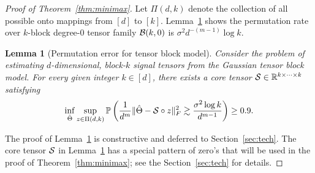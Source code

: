 \documentclass[12pt]{article}
\newtheorem{lem}{Lemma}
\theoremstyle{definition}
\begin{document}
\begin{proof}[Proof of Theorem~\ref{thm:minimax}]
Let $\Pi(d,k)$ denote the collection of all possible onto mappings from $[d]$ to $[k]$.
Lemma~\ref{lem:permutation} shows the permutation rate over  $k$-block degree-0 tensor family $\mathcal{B}(k,0)$ is $\sigma^2 d^{-(m-1)}\log k$. 
\begin{lem}[Permutation error for tensor block model]\label{lem:permutation}
Consider the problem of estimating $d$-dimensional, block-$k$ signal tensors from the Gaussian tensor block model.
For every given integer $k\in[d]$, there exists a core tensor $\mathcal{S}\in\mathbb{R}^{k\times \cdots \times k}$ satisfying
\begin{equation}\label{eq:givenC}
\inf_{\hat \Theta}\sup_{z \in \Pi(d,k)}\mathbb{P}\left( {1\over d^m}\lVert\hat \Theta-\mathcal{S}\circ z\rVert_F ^2\gtrsim \frac{\sigma^2\log k} {d^{m-1}}\right)\geq 0.9.
\end{equation}
\end{lem}
The proof of Lemma~\ref{lem:permutation} is constructive and deferred to Section~\ref{sec:tech}. The core tensor $\mathcal{S}$ in Lemma~\ref{lem:permutation} has a special pattern of zero's that will be used in the proof of Theorem~\ref{thm:minimax}; see the Section~\ref{sec:tech} for details. 


\end{proof}
\end{document}
